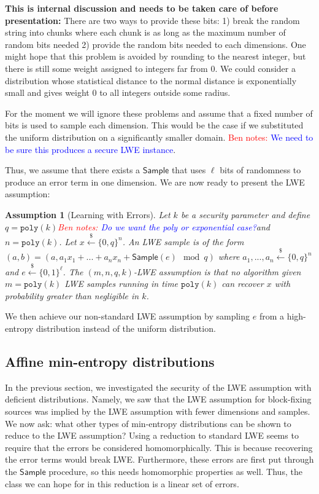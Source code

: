 \documentclass[11pt]{article}
\newcommand{\class}[1]{{\ensuremath{\mathsf{#1}}}}
\newcommand{\sample}{\ensuremath{\class{Sample}}\xspace}
\newcommand{\poly}{\ensuremath{\mathtt{poly}}\xspace}
\newtheorem{assumption}[theorem]{Assumption}
\newcommand{\authnote}[2]{{\textcolor{red}{\textsf{#1 notes: }\textcolor{blue}{ #2}}\marginpar{\textcolor{red}{\textbf{!!!!!}}}}}
\newcommand{\authnote}[2]{}
\newcommand{\bnote}[1]{{\authnote{Ben}{#1}}}
\begin{document}
{\textbf{This is internal discussion and needs to be taken care of before presentation:}  There are two ways to provide these bits: 1) break the random string into chunks where each chunk is as long as the maximum number of random bits needed 2) provide the random bits needed to each dimensions.  One might hope that this problem is avoided by rounding to the nearest integer, but there is still some weight assigned to integers far from $0$.  We could consider a distribution whose statistical distance to the normal distance is exponentially small and gives weight 0 to all integers outside some radius.

For the moment we will ignore these problems and assume that a fixed number of bits is used to sample each dimension.  This would be the case if we substituted the uniform distribution on a significantly smaller domain.  \bnote{We need to be sure this produces a secure LWE instance}.

Thus, we assume that there exists a $\sample$ that uses $\ell$ bits of randomness to produce an error term in one dimension.  We are now ready to present the LWE assumption:
\begin{assumption}[Learning with Errors]
Let $k$ be a security parameter and define $q=\poly(k)$\bnote{Do we want the poly or exponential case?}and $n = \poly( k)$.
Let $x\overset{\$}\leftarrow \{0,q\}^n$.   An LWE sample is of the form $(a,b) = (a, a_1x_1+...+a_nx_n+\sample(e) \mod q)$ where $a_1,...,a_n\overset{\$}\leftarrow\{0,q\}^n$ and $e\overset{\$}\leftarrow\{0,1\}^\ell$.  The $(m,n,q,k)$-LWE assumption is that no algorithm given $m = \poly(k)$ LWE samples running in time $\poly(k)$ can recover $x$ with probability greater than negligible in $k$.
\end{assumption}

We then achieve our non-standard LWE assumption by sampling $e$ from a high-entropy distribution instead of the uniform distribution.

\subsection{Affine min-entropy distributions}
In the previous section, we investigated the security of the LWE assumption with deficient distributions.  Namely, we saw that the LWE assumption for block-fixing sources was implied by the LWE assumption with fewer dimensions and samples.  We now ask: what other types of min-entropy distributions can be shown to reduce to the LWE assumption?  Using a reduction to standard LWE seems to require that the errors be considered homomorphically.  This is because recovering the error terms would break LWE.  Furthermore, these errors are first put through the \sample procedure, so this needs homomorphic properties as well.  Thus, the class we can hope for in this reduction is a linear set of errors.

}
\end{document}
